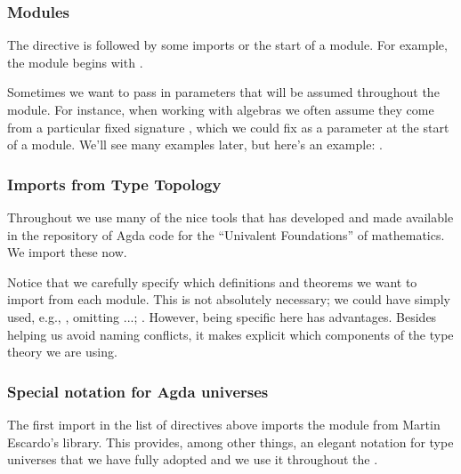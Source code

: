 \subsubsection{Modules}\label{modules}

The  directive is followed by some imports or the start of a module.
For example, the \Preliminaries module begins with \AgdaSpace{}%
\AgdaSpace{}.

Sometimes we want to pass in parameters that will be assumed throughout the module. For instance, when working with algebras we often assume they come from a particular fixed signature , which we could fix as a parameter at the start of a module. We'll see many examples later, but here's an example:
\AgdaSpace{}\AgdaModule{\AgdaUnderscore{}}\AgdaSpace{}%
\AgdaSymbol{\{}\AgdaSpace{}%
\AgdaSymbol{:}\AgdaSpace{}%
\AgdaSpace{}%
\AgdaSpace{}%
\AgdaSymbol{\}}\AgdaSpace{}%
.


\subsubsection{Imports from Type Topology}\label{imports-from-type-topology}
Throughout we use many of the nice tools that \mhe has developed and made available in the \TypeTopology repository of Agda code for the ``Univalent Foundations'' of mathematics. We import these now.
\ccpad

\ccpad
Notice that we carefully specify which definitions and theorems we want to import from each module. This is not absolutely necessary; we could have simply used, e.g., \AgdaSpace{}\AgdaSpace{}\AgdaSpace{}, omitting \AgdaSpace{}\AgdaSymbol{(}\AgdaSymbol{;}\AgdaSpace{}\AgdaSymbol{;} ...; \AgdaSpace{}\AgdaSymbol{)}. However, being specific here has advantages. Besides helping us avoid naming conflicts, it makes explicit which components of the type theory we are using.

\subsubsection{Special notation for Agda universes}
\label{special-notation-for-agda-universes}
The first import in the list of \AgdaSpace{} directives above imports the \universes module from Martin Escardo's \TypeTopology library. This provides, among other things, an elegant notation for type universes that we have fully adopted and we use it throughout the \agdaualib.

